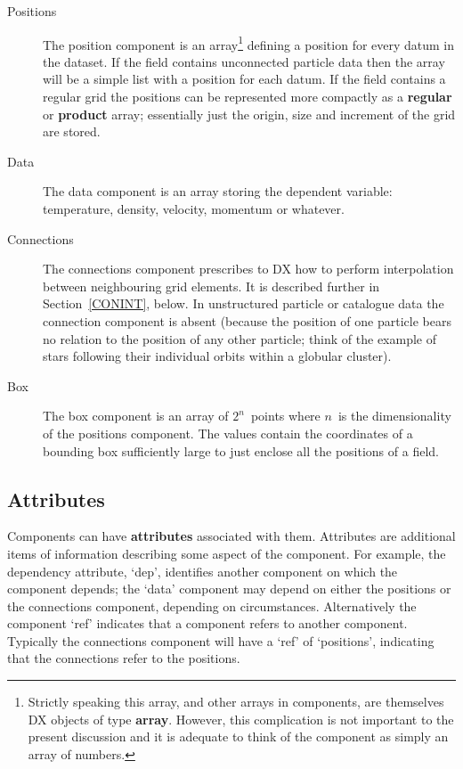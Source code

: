 \documentclass[twoside,11pt]{starlink}
\begin{document}
\begin{description}

  \item[Positions] The position component is an array\footnote{Strictly
   speaking this array, and other arrays in components, are themselves
   DX objects of type \textbf{array}. However, this complication is not
   important to the present discussion and it is adequate to think of
   the component as simply an array of numbers.} defining a
   position for every datum in the dataset. If the field contains
   unconnected particle data then the array will be a simple list
   with a position for each datum. If the field contains a regular
   grid the positions can be represented more compactly as a \textbf{regular} or \textbf{product} array; essentially just the origin, size
   and increment of the grid are stored.

  \item[Data] The data component is an array storing the dependent
   variable: temperature, density, velocity, momentum or whatever.

  \item[Connections] The connections component prescribes to DX how
   to perform interpolation between neighbouring grid elements. It
   is described further in Section~\ref{CONINT}, below. In unstructured
   particle or catalogue data the connection component is absent
   (because the position of one particle bears no relation to the
   position of any other particle; think of the example of stars following
   their individual orbits within a globular cluster).

  \item[Box] The box component is an array of $2^{n}$\, points where
   $n$\, is the dimensionality of the positions component. The values
   contain the coordinates of a bounding box sufficiently large to
   just enclose all the positions of a field.

\end{description}

\subsection{Attributes}

Components can have \textbf{attributes} associated with them. Attributes
are additional items of information describing some aspect of the
component. For example, the dependency attribute, `dep', identifies
another component on which the component depends; the `data' component
may depend on either the positions or the connections component, depending
on circumstances. Alternatively the component `ref' indicates that a
component refers to another component. Typically the connections
component will have a `ref' of `positions', indicating that the
connections refer to the positions.
\end{document}
